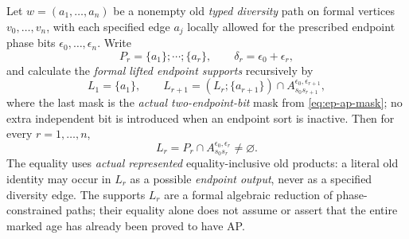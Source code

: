 \begin{lemma}
\label{lem:ep-ap-path}
Let $w=(a_1,\ldots,a_n)$ be a nonempty
old \emph{typed diversity} path on formal
vertices $v_0,\ldots,v_n$, with each
specified edge $a_j$ locally allowed for
the prescribed endpoint phase bits
$\epsilon_0,\ldots,\epsilon_n$.
Write
\[
 P_r=\{a_1\};\cdots;\{a_r\},\qquad
 \delta_r=\epsilon_0+\epsilon_r,
\]
and calculate the \emph{formal lifted
endpoint supports} recursively by
\[
 L_1=\{a_1\},\qquad
 L_{r+1}=(L_r;\{a_{r+1}\})\cap
       A_{s_0s_{r+1}}^{\epsilon_0,\epsilon_{r+1}},
\]
where the last mask is the \emph{actual two-endpoint-bit}
mask from \eqref{eq:ep-ap-mask}; no extra independent
bit is introduced when an endpoint sort is inactive.
Then for every $r=1,\ldots,n$,
\[
 \boxed{\qquad
 L_r=P_r\cap A_{s_0s_r}^{\epsilon_0,\epsilon_r}
                      \ne\varnothing .\qquad}
 \tag{S4}\label{eq:ep-ap-path-normal-form}
\]
The equality uses \emph{actual represented}
equality-inclusive old products: a literal
old identity may occur in $L_r$ as a
possible \emph{endpoint output}, never
as a specified diversity edge.
The supports $L_r$ are a formal
algebraic reduction of phase-constrained
paths; their equality alone does not
assume or assert that the entire marked
age has already been proved to have AP.
\end{lemma}
